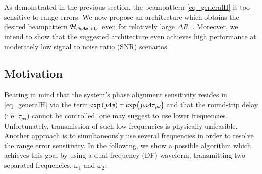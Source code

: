 As demonstrated in the previous section, the beampattern \eqref{eq_generalH} is too sensitive to range errors.
We now propose an architecture which obtains the desired beampattern $\mathcal{H}_{\Delta\theta,\Delta\phi\to0,r}$ even for relatively large $\Delta R_{\text{rt}}$. Moreover, we intend to show that the suggested architecture even achieves high performance at moderately low signal to noise ratio (SNR) scenarios.

\subsection*{Motivation}
Bearing in mind that the system's phase alignment sensitivity resides in \eqref{eq_generalH} via the  term $\exp\left({j\Delta\phi}\right)=\exp\left({j\omega\Delta\tau_{pd}}\right)$ and that the round-trip delay (i.e. $\tau_{pd}$) cannot be controlled, one may suggest to use lower frequencies. Unfortunately, transmission of such low frequencies is physically unfeasible. 
Another approach is to simultaneously use several frequencies in order to resolve the range error sensitivity. 
In the following, we show a possible algorithm which achieves this goal by using a dual frequency (DF) waveform, transmitting two separated frequencies, $\omega_1$ and $\omega_2$.


